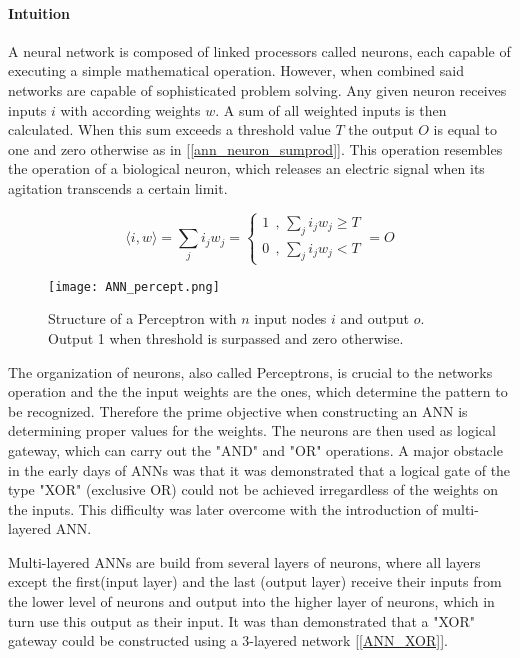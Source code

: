 		\paragraph{Intuition}
		A neural network is composed of linked processors called neurons, each capable of executing a simple mathematical operation. However, when combined said networks are capable of sophisticated problem solving. Any given neuron receives inputs $ i $ with according weights $ w $. A sum of all weighted inputs is then calculated. When this sum exceeds a threshold value $ T $ the output $ O $ is equal to one and zero otherwise as in [\ref{ann_neuron_sumprod}]. This operation resembles the operation of a biological neuron, which releases an electric signal when its agitation transcends a certain limit.
		
		\begin{equation}
			\langle i,w \rangle = \sum_j i_j w_j = 
				\begin{cases}
					1 \ \ \text{,  } \sum_j i_j w_j \geq T \\
					0 \ \ \text{,  } \sum_j i_j w_j < T 
				\end{cases}
				 = O
			\label{ann_neuron_sumprod}
		\end{equation}
		
		\begin{figure}[h]
			\centering
			\captionsetup{width=0.8\textwidth}
			\texttt{[image: ANN\_percept.png]}
			\caption[ANN Perceptron]{
				\footnotesize{
					Structure of a Perceptron with $ n $ input nodes $ i $ and output $ o $. Output 1 when threshold is surpassed and zero otherwise.
				}
			} 
			\label{ANN_percept}
		\end{figure}
		
		The organization of neurons, also called Perceptrons, is crucial to the networks operation and the the input weights are the ones, which determine the pattern to be recognized. Therefore the prime objective when constructing an ANN is determining proper values for the weights. The neurons are then used as logical gateway, which can carry out the "AND" and "OR" operations. A major obstacle in the early days of ANNs was that it was demonstrated that a logical gate of the type "XOR" (exclusive OR) could not be achieved irregardless of the weights on the inputs. This difficulty was later overcome with the introduction of multi-layered ANN.
		
		Multi-layered ANNs are build from several layers of neurons, where all layers except the first(input layer) and the last (output layer) receive their inputs from the lower level of neurons and output into the higher layer of neurons, which in turn use this output as their input. It was than demonstrated that a "XOR" gateway could be constructed using a 3-layered network [\ref{ANN_XOR}].
		
